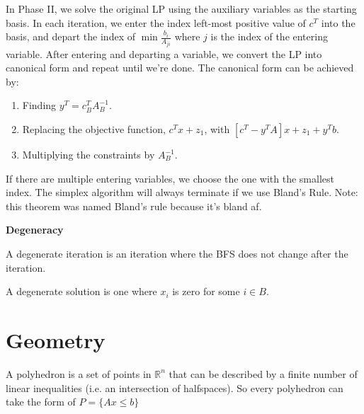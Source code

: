 \documentclass[a4paper]{report}
\begin{document}
\begin{definition}
  In Phase II, we solve the original LP using the auxiliary variables as the starting basis. In each iteration, we enter the index left-most positive value of $c^T$ into the basis, and depart the index of $\min \frac {b_i} {A_{ji}}$ where $j$ is the index of the entering variable. After entering and departing a variable, we convert the LP into canonical form and repeat until we're done. The canonical form can be achieved by:
  \begin{enumerate}
    \item Finding $y^T = c_B^T A_B^{-1}$.
    \item Replacing the objective function, $c^T x + z_1$, with $[c^T - y^T A]x + z_1 + y^T b$.
    \item Multiplying the constraints by $A_B^{-1}$.
  \end{enumerate}
\end{definition}

\begin{theorem}
  If there are multiple entering variables, we choose the one with the smallest index. The simplex algorithm will always terminate if we use Bland's Rule. Note: this theorem was named Bland's rule because it's bland af.
\end{theorem}

\begin{definition*}
  \textbf{Degeneracy}
\item \begin{definition}\label{degeneracy:i}
  A degenerate iteration is an iteration where the BFS does not change after the iteration.
\end{definition}

\item \begin{definition}\label{degeneracy:ii}
  A degenerate solution is one where $x_i$ is zero for some $i \in B$.
\end{definition}

\end{definition*}

\section{Geometry}
\begin{definition}[Polyhedron]
  A polyhedron is a set of points in $\mathbb R^n$ that can be described by a finite number of linear inequalities (i.e. an intersection of halfspaces). So every polyhedron can take the form of $P = \{Ax \leq b\}$
\end{definition}
\end{document}
